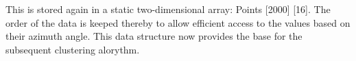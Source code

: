 \documentclass[11pt,oneside,openright]{mpreport}
\begin{document}

\begin{center}
\end{center}

This is stored  again  in a static two-dimensional array: Points [2000] [16]. The order of the data is keeped thereby to allow efficient access to 
the values based on their azimuth angle. This data structure now provides the base for the subsequent clustering alorythm.

\end{document}
